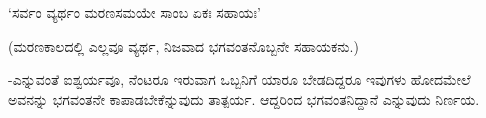 \begin{shloka}
`ಸರ್ವಂ ವ್ಯರ್ಥಂ ಮರಣಸಮಯೇ ಸಾಂಬ ಏಕಃ ಸಹಾಯಃ'
\end{shloka}

(ಮರಣಕಾಲದಲ್ಲಿ ಎಲ್ಲವೂ ವ್ಯರ್ಥ, ನಿಜವಾದ ಭಗವಂತನೊಬ್ಬನೇ ಸಹಾಯಕನು.)

-ಎನ್ನುವಂತೆ ಐಶ್ವರ್ಯವೂ, ನೆಂಟರೂ ಇರುವಾಗ ಒಬ್ಬನಿಗೆ ಯಾರೂ ಬೇಡದಿದ್ದರೂ ಇವುಗಳು ಹೋದಮೇಲೆ ಅವನನ್ನು ಭಗವಂತನೇ ಕಾಪಾಡಬೇಕೆನ್ನುವುದು ತಾತ್ಪರ್ಯ. ಆದ್ದರಿಂದ ಭಗವಂತನಿದ್ದಾನೆ ಎನ್ನುವುದು ನಿರ್ಣಯ.






































































































